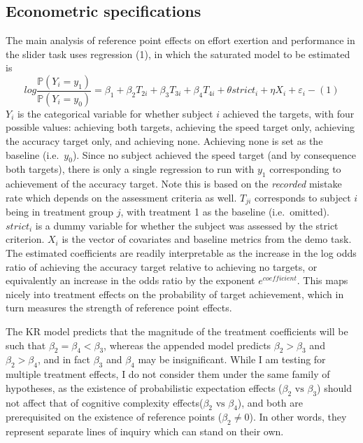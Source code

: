 \documentclass[
  12,
  letterpaper,
  DIV=11,
  numbers=noendperiod]{scrartcl}
\begin{document}
\subsection{Econometric
specifications}\label{econometric-specifications}

The main analysis of reference point effects on effort exertion and
performance in the slider task uses regression (1), in which the
saturated model to be estimated is \[
log \frac {\mathbb{P}(Y_i = y_1)}{\mathbb{P}(Y_i = y_0)} = \beta_{1} + \beta_2 T_{2i} +\beta_3 T_{3i} +\beta_4 T_{4i} + \theta strict_i + \eta X_i + \varepsilon_i -(1)
\] \(Y_i\) is the categorical variable for whether subject \(i\)
achieved the targets, with four possible values: achieving both targets,
achieving the speed target only, achieving the accuracy target only, and
achieving none. Achieving none is set as the baseline (i.e.~\(y_0\)).
Since no subject achieved the speed target (and by consequence both
targets), there is only a single regression to run with \(y_1\)
corresponding to achievement of the accuracy target. Note this is based
on the \emph{recorded} mistake rate which depends on the assessment
criteria as well. \(T_{ji}\) corresponds to subject \(i\) being in
treatment group \(j\), with treatment 1 as the baseline (i.e.~omitted).
\(strict_i\) is a dummy variable for whether the subject was assessed by
the strict criterion. \(X_i\) is the vector of covariates and baseline
metrics from the demo task. The estimated coefficients are readily
interpretable as the increase in the log odds ratio of achieving the
accuracy target relative to achieving no targets, or equivalently an
increase in the odds ratio by the exponent \(e^{coefficient}\). This
maps nicely into treatment effects on the probability of target
achievement, which in turn measures the strength of reference point
effects.

The KR model predicts that the magnitude of the treatment coefficients
will be such that \(\beta_2 = \beta_4 < \beta_3\), whereas the appended
model predicts \(\beta_2 > \beta_3\) and \(\beta_2 > \beta_4\), and in
fact \(\beta_3\) and \(\beta_4\) may be insignificant. While I am
testing for multiple treatment effects, I do not consider them under the
same family of hypotheses, as the existence of probabilistic expectation
effects (\(\beta_2 \text{ vs } \beta_3\)) should not affect that of
cognitive complexity effects(\(\beta_2 \text{ vs } \beta_4\)), and both
are prerequisited on the existence of reference points
(\(\beta_2 \neq 0\)). In other words, they represent separate lines of
inquiry which can stand on their own.
\end{document}
